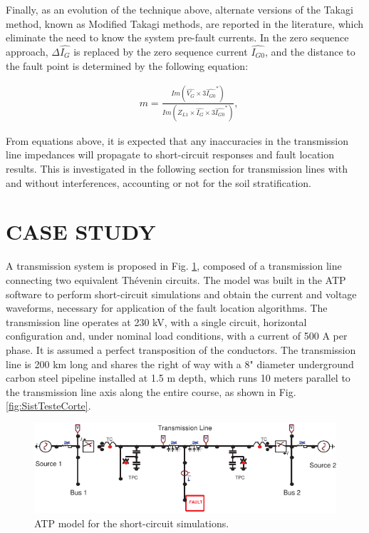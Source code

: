 \documentclass[conference]{IEEEtran}
\begin{document}
	Finally, as an evolution of the technique above, alternate versions of the Takagi method, known as Modified Takagi methods, are reported in the literature, which eliminate the need to know the system pre-fault currents. In the zero sequence approach, $\Delta\widehat{I_G}$ is replaced by the zero sequence current $\widehat{I_{G0}}$, and the distance to the fault point is determined by the following equation:
	
	\begin{equation}\label{eq:mTakagiMod}
		\begin{aligned}
			&m=\frac{Im(\widehat{V_G}\times3\widehat{I_{G0}}^*)}{Im(Z_{L1}\times\widehat{I_G}\times3\widehat{I_{G0}}^*)},
		\end{aligned}
	\end{equation}
	
	From equations above, it is expected that any inaccuracies in the transmission line impedances will propagate to short-circuit responses and fault location results. This is investigated in the following section for transmission lines with and without interferences, accounting or not for the soil stratification.
	
	
	\section{CASE STUDY}
	
	A transmission system is proposed in Fig. \ref{fig:Sistema230kV}, composed of a transmission line connecting two equivalent Thévenin circuits. The model was built in the ATP software to perform short-circuit simulations and obtain the current and voltage waveforms, necessary for application of the fault location algorithms. The transmission line operates at 230 kV, with a single circuit, horizontal configuration and, under nominal load conditions, with a current of 500 A per phase. It is assumed a perfect transposition of the conductors. The transmission line is 200 km long and shares the right of way with a 8" diameter underground carbon steel pipeline installed at 1.5 m depth, which runs 10 meters parallel to the transmission line axis along the entire course, as shown in Fig. \ref{fig:SistTesteCorte}. 
	\begin{figure}[hbt]
		\begin{center}
			\includegraphics[width=1\columnwidth]{./fig/Sistema230kV2.pdf}
			\caption{ATP model for the short-circuit simulations.}
			\label{fig:Sistema230kV}
		\end{center}
	\end{figure}
	
\end{document}
